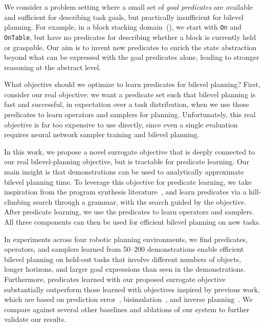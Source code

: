 We consider a problem setting where a small set of \emph{goal predicates} are available and sufficient for describing task goals, but practically insufficient for bilevel planning.
For example, in a block stacking domain~(), we start with \texttt{On} and \texttt{OnTable}, but have no predicates for describing whether a block is currently held or graspable.
Our aim is to invent new predicates to enrich the state abstraction beyond what can be expressed with the goal predicates alone, leading to stronger reasoning at the abstract level.

What objective should we optimize to learn predicates for bilevel planning?
First, consider our real objective: we want a predicate set such that bilevel planning is fast and successful, in expectation over a task distribution, when we use those predicates to learn operators and samplers for planning.
Unfortunately, this real objective is far too expensive to use directly, since even a single evaluation requires neural network sampler training and bilevel planning.


In this work, we propose a novel surrogate objective that is deeply connected to our real bilevel-planning objective, but is tractable for predicate learning.
Our main insight is that demonstrations can be used to analytically approximate bilevel planning time.
To leverage this objective for predicate learning, we take inspiration from the program synthesis literature~\cite{menon2013machine,ellis2020dreamcoder}, and learn predicates via a hill-climbing search through a grammar, with the search guided by the objective.
After predicate learning, we use the predicates to learn operators and samplers.
All three components can then be used for efficient bilevel planning on new tasks.

In experiments across four robotic planning environments, we find predicates, operators, and samplers learned from 50--200 demonstrations enable efficient bilevel planning on held-out tasks that involve different numbers of objects, longer horizons, and larger goal expressions than seen in the demonstrations.
Furthermore, predicates learned with our proposed surrogate objective substantially outperform those learned with objectives inspired by previous work, which are based on prediction error~\cite{pasula2007learning,jetchev2013learning}, bisimulation~\cite{konidaris2018skills,curtis2021discovering}, and inverse planning~\cite{baker2009action,ramirez2010probabilistic,zhi2020online}.
We compare against several other baselines and ablations of our system to further validate our results.

